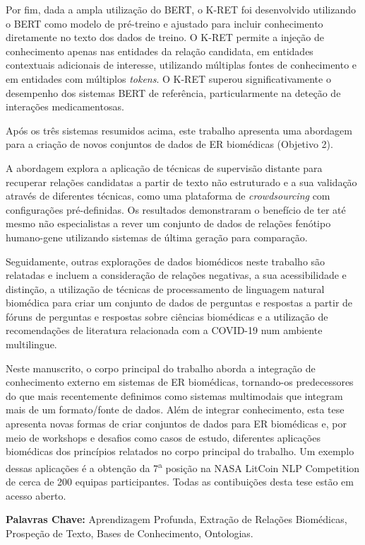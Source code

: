 Por fim, dada a ampla utilização do BERT, o K-RET foi desenvolvido utilizando o BERT como modelo de pré-treino e ajustado para incluir conhecimento diretamente no texto dos dados de treino. O K-RET permite a injeção de conhecimento apenas nas entidades da relação candidata, em entidades contextuais adicionais de interesse, utilizando múltiplas fontes de conhecimento e em entidades com múltiplos \textit{tokens}. O K-RET superou significativamente o desempenho dos sistemas BERT de referência, particularmente na deteção de interações medicamentosas.

Após os três sistemas resumidos acima, este trabalho apresenta uma abordagem para a criação de novos conjuntos de dados de ER biomédicas (Objetivo 2).

A abordagem explora a aplicação de técnicas de supervisão distante para recuperar relações candidatas a partir de texto não estruturado e a sua validação através de diferentes técnicas, como uma plataforma de \textit{crowdsourcing} com configurações pré-definidas. Os resultados demonstraram o benefício de ter até mesmo não especialistas a rever um conjunto de dados de relações fenótipo humano-gene utilizando sistemas de última geração para comparação.

Seguidamente, outras explorações de dados biomédicos neste trabalho são relatadas e incluem a consideração de relações negativas, a sua acessibilidade e distinção, a utilização de técnicas de processamento de linguagem natural biomédica para criar um conjunto de dados de perguntas e respostas a partir de fóruns de perguntas e respostas sobre ciências biomédicas e a utilização de recomendações de literatura relacionada com a COVID-19 num ambiente multilingue.

Neste manuscrito, o corpo principal do trabalho aborda a integração de conhecimento externo em sistemas de ER biomédicas, tornando-os predecessores do que mais recentemente definimos como sistemas multimodais que integram mais de um formato/fonte de dados. Além de integrar conhecimento, esta tese apresenta novas formas de criar conjuntos de dados para ER biomédicas e, por meio de workshops e desafios como casos de estudo, diferentes aplicações biomédicas dos princípios relatados no corpo principal do trabalho. Um exemplo dessas aplicações é a obtenção da 7\textsuperscript{a} posição na NASA LitCoin NLP Competition de cerca de 200 equipas participantes. Todas as contibuições desta tese estão em acesso aberto. 

\vspace{0.5cm}

\textbf{Palavras Chave:} Aprendizagem Profunda, Extração de Relações Biomédicas, Prospeção de Texto, Bases de Conhecimento, Ontologias. 